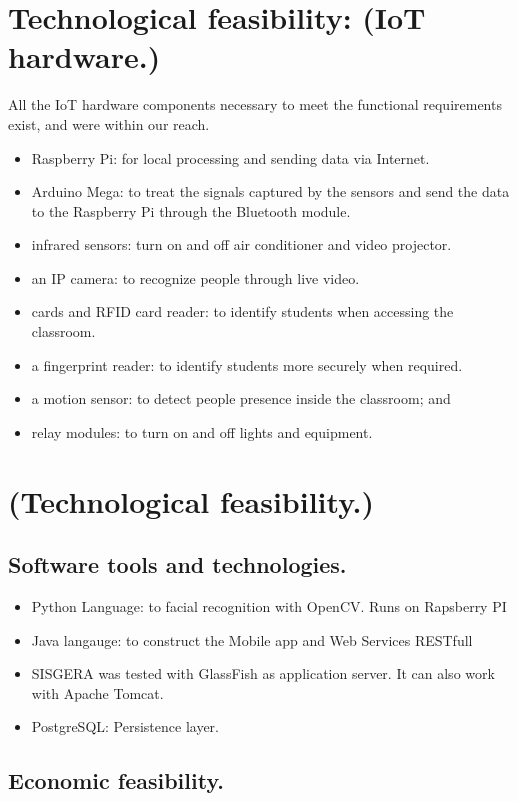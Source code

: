 \documentclass[]{scrartcl}
\begin{document}
\section*{Technological feasibility: (IoT hardware.)}
	All the IoT hardware components necessary to meet the functional requirements exist, and were within our reach.
	\begin{itemize}
		\item Raspberry Pi: for local processing and sending data via Internet.
		\item Arduino Mega: to treat the signals captured by the sensors and send the data to the Raspberry Pi through the Bluetooth module.
		\item infrared sensors: turn on and off air conditioner and video projector.
		\item an IP camera: to recognize people through live video.
		\item cards and RFID card reader: to identify students when accessing the classroom.
		\item a fingerprint reader: to identify students more securely when required.
		\item a motion sensor: to detect people presence inside the classroom; and
		\item relay modules: to turn on and off lights and equipment.
	\end{itemize}

\section*{(Technological feasibility.)}
	\subsection*{Software tools and technologies.}
		\begin{itemize}
			\item Python Language: to facial recognition with OpenCV. Runs on Rapsberry PI
			\item Java langauge: to construct the Mobile app and Web Services RESTfull
			\item SISGERA was tested with GlassFish as application server. It can also work with Apache Tomcat.
			\item PostgreSQL: Persistence layer.
		\end{itemize}
	\subsection*{Economic feasibility.}
	
\end{document}
